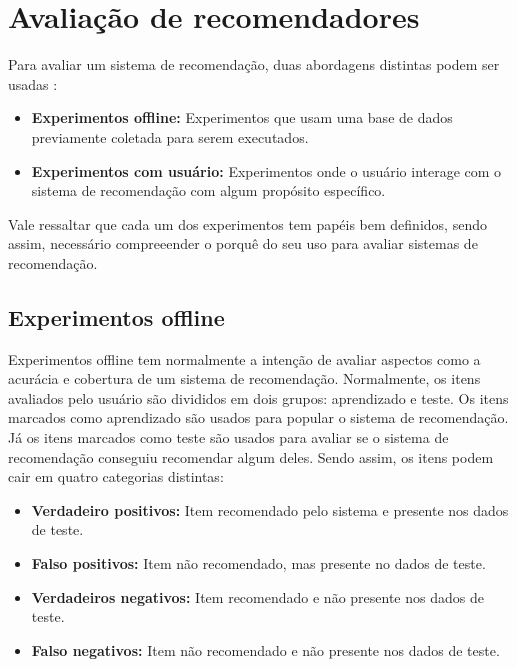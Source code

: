 \section{Avaliação de recomendadores}

Para avaliar um sistema de recomendação, duas abordagens distintas podem ser
usadas \cite{herlocker2004evaluating}:

\begin{itemize}
    \item \textbf{Experimentos offline: } Experimentos que usam uma base de
        dados previamente coletada para serem executados.
    \item \textbf{Experimentos com usuário: } Experimentos onde o usuário
        interage com o sistema de recomendação com algum propósito específico.
\end{itemize}

Vale ressaltar que cada um dos experimentos tem papéis bem definidos, sendo
assim, necessário compreeender o porquê do seu uso para avaliar sistemas de
recomendação.

\subsection{Experimentos offline} \label{sec:rec_experimentos_offline}

Experimentos offline tem normalmente a intenção de avaliar aspectos como a
acurácia e cobertura de um sistema de recomendação. Normalmente, os itens
avaliados pelo usuário são divididos em dois grupos: aprendizado e teste. Os
itens marcados como aprendizado são usados para popular o sistema de
recomendação. Já os itens marcados como teste são usados para avaliar se o
sistema de recomendação conseguiu recomendar algum deles. Sendo assim, os itens
podem cair em quatro categorias distintas:

\begin{itemize}
    \item \textbf{Verdadeiro positivos: } Item recomendado pelo sistema e
        presente nos dados de teste.
    \item \textbf{Falso positivos: } Item não recomendado, mas presente no dados
        de teste.
    \item \textbf{Verdadeiros negativos: } Item recomendado e não presente
        nos dados de teste.
    \item \textbf{Falso negativos: } Item não recomendado e não presente nos
        dados de teste.
\end{itemize}

